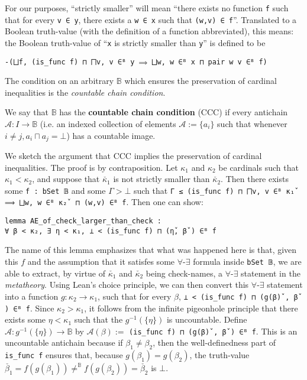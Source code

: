 \documentclass[a4paper,USenglish,cleveref, autoref]{lipics-v2019}
\newcommand{\B}{\mathbb{B}}
\newcommand{\lil}{\lstinline}
\begin{document}
\begin{definition}
  For our purposes, ``strictly smaller'' will mean ``there exists no function \lil{f} such that for every \lil{v ∈ y}, there exists a \lil{w ∈ x} such that \lil{(w,v) ∈ f}''. Translated to a Boolean truth-value (with the definition of a function abbreviated), this means: the Boolean truth-value of ``\lil{x} is strictly smaller than \lil{y}'' is defined to be
\begin{center}\lstinline{-(⨆f, (is_func f) ⊓ ⨅v, v ∈ᴮ y ⟹ ⨆w, w ∈ᴮ x ⊓ pair w v ∈ᴮ f)}\end{center}
\end{definition}

The condition on an arbitrary $\B$ which ensures the preservation of cardinal inequalities is the \emph{countable chain condition}.

\begin{definition}
We say that $\B$ has the \textbf{countable chain condition} (CCC) if every antichain $\mathcal{A} : I \to \B$ (i.e. an indexed collection of elements $\mathcal{A} := \{a_i\}$ such that whenever $i \neq j, a_i \sqcap a_j = \bot$) has a countable image.
\end{definition}

We sketch the argument that CCC implies the preservation of cardinal inequalities. The proof is by contraposition. Let $\kappa_1$ and $\kappa_2$ be cardinals such that $\kappa_1 < \kappa_2$, and suppose that $\check{\kappa_1}$ is not strictly smaller than $\check{\kappa_2}$. Then there exists some \lil{f : bSet 𝔹} and some $\Gamma > \bot$ such that \lstinline{Γ ≤ (is_func f) ⊓ ⨅v, v ∈ᴮ κ₁̌  ⟹ ⨆w, w ∈ᴮ κ₂̌  ⊓ (w,v) ∈ᴮ f}. Then one can show:
\begin{lstlisting}
lemma AE_of_check_larger_than_check :
∀ β < κ₂, ∃ η < κ₁, ⊥ < (is_func f) ⊓ (η̌, β̌ ) ∈ᴮ f
\end{lstlisting}
The name of this lemma emphasizes that what was happened here is that, given this $f$ and the assumption that it satisfes some $\forall$-$\exists$ formula inside \lil{bSet 𝔹}, we are able to extract, by virtue of $\check{\kappa_1}$ and $\check{\kappa_2}$ being check-names, a $\forall$-$\exists$ statement in the \emph{metatheory}. Using Lean's choice principle, we can then convert this $\forall$-$\exists$ statement into a function $g : \kappa_2 \to \kappa_1$, such that for every $\beta$, \lstinline{⊥ < (is_func f) ⊓ (g(β)̌ , β̌ ) ∈ᴮ f}. Since $\kappa_2 > \kappa_1$, it follows from the infinite pigeonhole principle that there exists some $\eta < \kappa_1$ such that the $g^{-1}(\{\eta\})$ is uncountable. Define $\mathcal{A} : g^{-1}(\{\eta\}) \to \B$ by $\mathcal{A}(\beta) :=$ \lil{(is_func f) ⊓ (g(β)̌ , β̌ ) ∈ᴮ f}. This is an uncountable antichain because if $\beta_1 \neq \beta_2$, then the well-definedness part of \lil{is_func f} ensures that, because $g(\beta_1) = g(\beta_2)$, the truth-value $\check{\beta_1} = f(g(\beta_1)) \neq^\B f(g(\beta_2)) = \check{\beta_2}$ is $\bot$.
\end{document}
